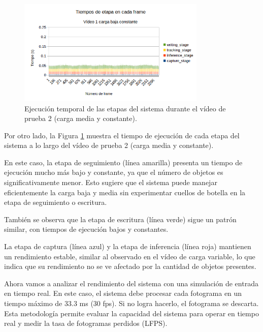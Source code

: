 \documentclass[11pt,spanish,listoffigures,listoftables]{tfgetsinf}
\begin{document}
\begin{figure}[H]
   \centering
   \includegraphics[width=0.8\textwidth]{images/analisis_de_la_solucion/tiempos_etapa_video1.png}
   \caption{Ejecución temporal de las etapas del sistema durante el vídeo de prueba 2 (carga media y constante).}
   \label{fig:tiempos_etapa_video1}
\end{figure}

Por otro lado, la Figura \ref{fig:tiempos_etapa_video1} muestra el tiempo de ejecución de cada etapa del sistema a lo largo del vídeo de prueba 2 (carga media y constante).

En este caso, la etapa de seguimiento (línea amarilla) presenta un tiempo de ejecución mucho más bajo y constante, ya que el número de objetos es significativamente menor. Esto sugiere que el sistema puede manejar eficientemente la carga baja y media sin experimentar cuellos de botella en la etapa de seguimiento o escritura. 

También se observa que la etapa de escritura (línea verde) sigue un patrón similar, con tiempos de ejecución bajos y constantes. 

La etapa de captura (línea azul) y la etapa de inferencia (línea roja) mantienen un rendimiento estable, similar al observado en el vídeo de carga variable, lo que indica que su rendimiento no se ve afectado por la cantidad de objetos presentes.



Ahora vamos a analizar el rendimiento del sistema con una simulación de entrada en tiempo real. En este caso, el sistema debe procesar cada fotograma en un tiempo máximo de 33.3 ms (30 fps). Si no logra hacerlo, el fotograma se descarta. Esta metodología permite evaluar la capacidad del sistema para operar en tiempo real y medir la tasa de fotogramas perdidos (LFPS).
\end{document}
